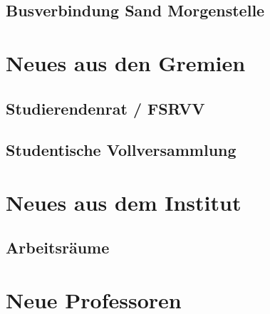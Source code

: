 \documentclass{fsinewsletter}
\begin{document}
\subsection{Busverbindung Sand Morgenstelle}


\newpage
\section{Neues aus den Gremien}


\subsection{Studierendenrat / FSRVV}


\subsection{Studentische Vollversammlung}



\newpage
\section{Neues aus dem Institut}
\subsection{Arbeitsräume}

\newpage
\section{Neue Professoren}


\newpage
\end{document}

